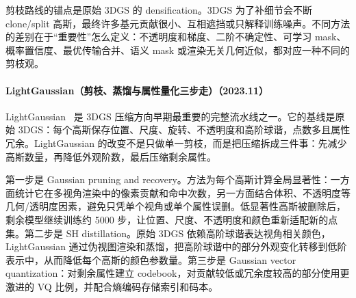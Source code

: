 剪枝路线的锚点是原始 3DGS 的 densification。3DGS 为了补细节会不断 clone/split 高斯，最终许多基元贡献很小、互相遮挡或只解释训练噪声。不同方法的差别在于“重要性”怎么定义：不透明度和梯度、二阶不确定性、可学习 mask、概率置信度、最优传输合并、语义 mask 或渲染无关几何近似，都对应一种不同的剪枝观。
\paragraph{LightGaussian（剪枝、蒸馏与属性量化三步走）（2023.11）}
LightGaussian~\cite{2311_17245} 是 3DGS 压缩方向早期最重要的完整流水线之一。它的基线是原始 3DGS：每个高斯保存位置、尺度、旋转、不透明度和高阶球谐，点数多且属性冗余。LightGaussian 的改变不是只做单一剪枝，而是把压缩拆成三件事：先减少高斯数量，再降低外观阶数，最后压缩剩余属性。

第一步是 Gaussian pruning and recovery。方法为每个高斯计算全局显著性：一方面统计它在多视角渲染中的像素贡献和命中次数，另一方面结合体积、不透明度等几何/透明度因素，避免只凭单个视角或单个属性误删。低显著性高斯被删除后，剩余模型继续训练约 5000 步，让位置、尺度、不透明度和颜色重新适配新的点集。第二步是 SH distillation。原始 3DGS 依赖高阶球谐表达视角相关颜色，LightGaussian 通过伪视图渲染和蒸馏，把高阶球谐中的部分外观变化转移到低阶表示中，从而降低每个高斯的颜色参数量。第三步是 Gaussian vector quantization：对剩余属性建立 codebook，对贡献较低或冗余度较高的部分使用更激进的 VQ 比例，并配合熵编码存储索引和码本。

